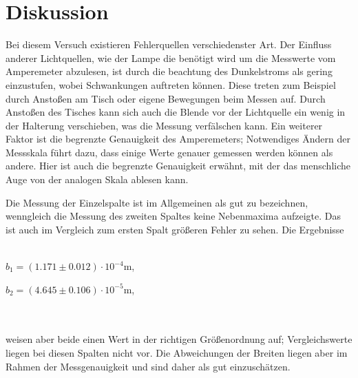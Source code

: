 \section{Diskussion}
\label{sec:Diskussion}
Bei diesem Versuch existieren Fehlerquellen verschiedenster Art. Der Einfluss anderer Lichtquellen, wie der Lampe die benötigt wird um 
die Messwerte vom Amperemeter abzulesen, ist durch die beachtung des Dunkelstroms als gering einzustufen, wobei Schwankungen auftreten können.
Diese treten zum Beispiel durch Anstoßen am Tisch oder eigene Bewegungen beim Messen auf. Durch Anstoßen des Tisches kann sich auch die Blende 
vor der Lichtquelle ein wenig in der Halterung verschieben, was die Messung verfälschen kann. Ein weiterer Faktor ist die begrenzte Genauigkeit
des Amperemeters; Notwendiges Ändern der Messskala führt dazu, dass einige Werte genauer gemessen werden können als andere. Hier ist auch die 
begrenzte Genauigkeit erwähnt, mit der das menschliche Auge von der analogen Skala ablesen kann. 

Die Messung der Einzelspalte ist im Allgemeinen als gut zu bezeichnen, wenngleich die Messung des zweiten Spaltes keine Nebenmaxima aufzeigte.
Das ist auch im Vergleich zum ersten Spalt größeren Fehler zu sehen. Die Ergebnisse
\\ \\
 \centerline{$b_1 = (1.171 \pm 0.012) \cdot 10^{-4}$m,}
 \centerline{$b_2 = (4.645\pm 0.106) \cdot 10^{-5}$m,}
\\ \\
weisen aber beide einen Wert in der richtigen Größenordnung auf; Vergleichswerte liegen bei diesen Spalten nicht vor.
Die Abweichungen der Breiten liegen aber im Rahmen der Messgenauigkeit und sind daher als gut einzuschätzen.
